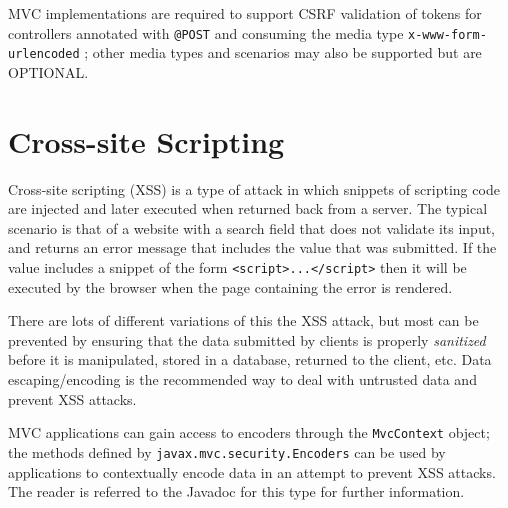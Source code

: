 MVC implementations are required to support CSRF validation of
tokens for controllers annotated with {\tt @POST} and consuming the
media type {\tt x-www-form-urlencoded} ; other media 
types and scenarios may also be supported but are OPTIONAL.

\section{Cross-site Scripting}

Cross-site scripting (XSS) is a type of attack in which snippets of scripting 
code are injected and later executed when returned back from a server. The
typical scenario is that of a website with a search field that does not validate
its input, and returns an error message that includes the value that was
submitted. If the value includes a snippet of the form {\tt <script>...</script>}
then it will be executed by the browser when the page containing the 
error is rendered.

There are lots of different variations of this the XSS attack, but most can be
prevented by ensuring that the data submitted by clients is properly {\em sanitized}
before it is manipulated, stored in a database, returned to the client, etc.
Data escaping/encoding is the recommended way to deal with untrusted
data and prevent XSS attacks. 

MVC applications can gain access to encoders through the {\tt MvcContext}
object; the methods defined by {\tt javax.mvc.security.Encoders} can be used
by applications to contextually encode data in an attempt to prevent 
XSS attacks. The reader is referred to the Javadoc for this type 
for further information.
